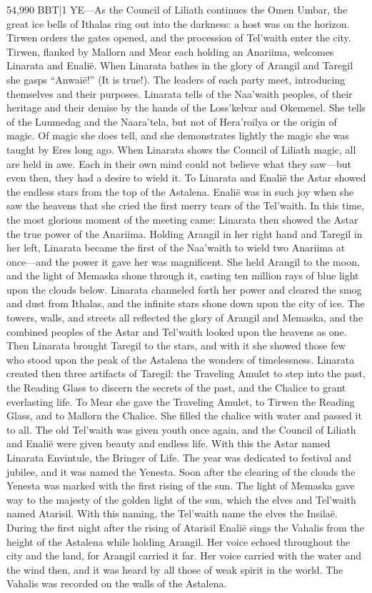 \documentclass[smalldemyvopaper,11pt,twoside,onecolumn,openright,extrafontsizes]{memoir}
\begin{document}
{{54,990 BBT|1 YE—As the Council of Liliath continues the Omen Umbar, the great ice bells of Ithalas ring out into the darkness: a host was on the horizon. Tirwen orders the gates opened, and the procession of Tel’waith enter the city. Tirwen, flanked by Mallorn and Mear each holding an Anariima, welcomes Linarata and Enalië. When Linarata bathes in the glory of Arangil and Taregil she gasps “Anwaië!” (It is true!). The leaders of each party meet, introducing themselves and their purposes. Linarata tells of the Naa’waith peoples, of their heritage and their demise by the hands of the Loss’kelvar and Okemenel. She tells of the Luumedag and the Naara’tela, but not of Hera’roilya or the origin of magic. Of magic she does tell, and she demonstrates lightly the magic she was taught by Eres long ago. When Linarata shows the Council of Liliath magic, all are held in awe. Each in their own mind could not believe what they saw—but even then, they had a desire to wield it. To Linarata and Enalië the Astar showed the endless stars from the top of the Astalena. Enalië was in such joy when she saw the heavens that she cried the first merry tears of the Tel’waith. 
In this time, the most glorious moment of the meeting came: Linarata then showed the Astar the true power of the Anariima. Holding Arangil in her right hand and Taregil in her left, Linarata became the first of the Naa’waith to wield two Anariima at once—and the power it gave her was magnificent. She held Arangil to the moon, and the light of Memaska shone through it, casting ten million rays of blue light upon the clouds below. Linarata channeled forth her power and cleared the smog and dust from Ithalas, and the infinite stars shone down upon the city of ice. The towers, walls, and streets all reflected the glory of Arangil and Memaska, and the combined peoples of the Astar and Tel’waith looked upon the heavens as one. Then Linarata brought Taregil to the stars, and with it she showed those few who stood upon the peak of the Astalena the wonders of timelessness. Linarata created then three artifacts of Taregil: the Traveling Amulet to step into the past, the Reading Glass to discern the secrets of the past, and the Chalice to grant everlasting life. To Mear she gave the Traveling Amulet, to Tirwen the Reading Glass, and to Mallorn the Chalice. She filled the chalice with water and passed it to all. The old Tel’waith was given youth once again, and the Council of Liliath and Enalië were given beauty and endless life. With this the Astar named Linarata Envintule, the Bringer of Life.
	The year was dedicated to festival and jubilee, and it was named the Yenesta. Soon after the clearing of the clouds the Yenesta was marked with the first rising of the sun. The light of Memaska gave way to the majesty of the golden light of the sun, which the elves and Tel’waith named Atarisil. With this naming, the Tel’waith name the elves the Insilaë. During the first night after the rising of Atarisil Enalië sings the Vahalis from the height of the Astalena while holding Arangil. Her voice echoed throughout the city and the land, for Arangil carried it far. Her voice carried with the water and the wind then, and it was heard by all those of weak spirit in the world. The Vahalis was recorded on the walls of the Astalena.
}}
\end{document}
